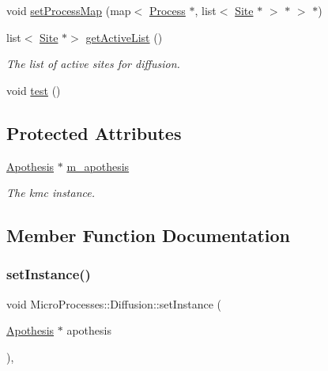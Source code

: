 \begin{DoxyCompactItemize}
void \mbox{\hyperlink{classMicroProcesses_1_1Diffusion_a53e5d56710045b4f8783d9c05591357f}{set\+Process\+Map}} (map$<$ \mbox{\hyperlink{classMicroProcesses_1_1Process}{Process}} $\ast$, list$<$ \mbox{\hyperlink{classSurfaceTiles_1_1Site}{Site}} $\ast$ $>$ $\ast$ $>$ $\ast$)
\item 
\mbox{\label{classMicroProcesses_1_1Diffusion_a8e19130f8f9948f1a6a446f4065027dd}} 
list$<$ \mbox{\hyperlink{classSurfaceTiles_1_1Site}{Site}} $\ast$$>$ \mbox{\hyperlink{classMicroProcesses_1_1Diffusion_a8e19130f8f9948f1a6a446f4065027dd}{get\+Active\+List}} ()
\begin{DoxyCompactList}\small\item\em The list of active sites for diffusion. \end{DoxyCompactList}\item 
void \mbox{\hyperlink{classMicroProcesses_1_1Diffusion_a281afcddb42b87ae9ba3b48a54524cd1}{test}} ()
\end{DoxyCompactItemize}
\subsection*{Protected Attributes}
\begin{DoxyCompactItemize}
\item 
\mbox{\label{classMicroProcesses_1_1Diffusion_aa5938a315954467db6f7d7f4e59fcf62}} 
\mbox{\hyperlink{classApothesis}{Apothesis}} $\ast$ \mbox{\hyperlink{classMicroProcesses_1_1Diffusion_aa5938a315954467db6f7d7f4e59fcf62}{m\+\_\+apothesis}}
\begin{DoxyCompactList}\small\item\em The kmc instance. \end{DoxyCompactList}\end{DoxyCompactItemize}


\subsection{Member Function Documentation}
\mbox{\label{classMicroProcesses_1_1Diffusion_a17993edabb08ca2fb96d22ef3cd838ca}} 
\subsubsection{\texorpdfstring{set\+Instance()}{setInstance()}}
{\footnotesize\ttfamily void Micro\+Processes\+::\+Diffusion\+::set\+Instance (\begin{DoxyParamCaption}\item[{\mbox{\hyperlink{classApothesis}{Apothesis}} $\ast$}]{apothesis }\end{DoxyParamCaption})\hspace{0.3cm}{\ttfamily [inline]}, {\ttfamily [virtual]}}

